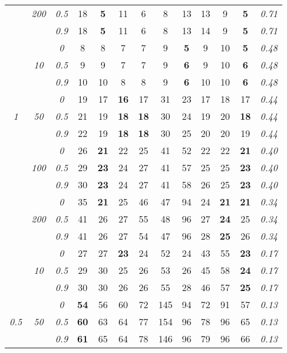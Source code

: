 \begin{table}
\begin{center}
\begin{tabular}{ccc|cc|cc|cc|cc|c|c}
 & \it  200  & \it  0.5  & 18 & {\bf 5} & 11 & 6 & 8 & 13 & 13 & 9 & {\bf 5} & \it  0.71 \\
& & \it  0.9  & 18 & {\bf 5} & 11 & 6 & 8 & 13 & 14 & 9 & {\bf 5} & \it  0.71 \\
\hline\rule{0pt}{3ex}
& & \it  0  & 8 & 8 & 7 & 7 & 9 & {\bf 5} & 9 & 10 & {\bf 5} & \it  0.48 \\
 & \it  10  & \it  0.5  & 9 & 9 & 7 & 7 & 9 & {\bf 6} & 9 & 10 & {\bf 6} & \it  0.48 \\
& & \it  0.9  & 10 & 10 & 8 & 8 & 9 & {\bf 6} & 10 & 10 & {\bf 6} & \it  0.48 \\[1ex]
\cline{2-3}\rule{0pt}{3ex}
& & \it  0  & 19 & 17 & {\bf 16} & 17 & 31 & 23 & 17 & 18 & 17 & \it  0.44 \\
\it  1  & \it  50  & \it  0.5  & 21 & 19 & {\bf 18} & {\bf 18} & 30 & 24 & 19 & 20 & {\bf 18} & \it  0.44 \\
& & \it  0.9  & 22 & 19 & {\bf 18} & {\bf 18} & 30 & 25 & 20 & 20 & 19 & \it  0.44 \\[1ex]
\cline{2-3}\rule{0pt}{3ex}
& & \it  0  & 26 & {\bf 21} & 22 & 25 & 41 & 52 & 22 & 22 & {\bf 21} & \it  0.40 \\
 & \it  100  & \it  0.5  & 29 & {\bf 23} & 24 & 27 & 41 & 57 & 25 & 25 & {\bf 23} & \it  0.40 \\
& & \it  0.9  & 30 & {\bf 23} & 24 & 27 & 41 & 58 & 26 & 25 & {\bf 23} & \it  0.40 \\[1ex]
\cline{2-3}\rule{0pt}{3ex}
& & \it  0  & 35 & {\bf 21} & 25 & 46 & 47 & 94 & 24 & {\bf 21} & {\bf 21} & \it  0.34 \\
 & \it  200  & \it  0.5  & 41 & 26 & 27 & 55 & 48 & 96 & 27 & {\bf 24} & 25 & \it  0.34 \\
& & \it  0.9  & 41 & 26 & 27 & 54 & 47 & 96 & 28 & {\bf 25} & 26 & \it  0.34 \\
\hline\rule{0pt}{3ex}
& & \it  0  & 27 & 27 & {\bf 23} & 24 & 52 & 24 & 43 & 55 & {\bf 23} & \it  0.17 \\
 & \it  10  & \it  0.5  & 29 & 30 & 25 & 26 & 53 & 26 & 45 & 58 & {\bf 24} & \it  0.17 \\
& & \it  0.9  & 30 & 30 & 26 & 26 & 55 & 28 & 46 & 57 & {\bf 25} & \it  0.17 \\[1ex]
\cline{2-3}\rule{0pt}{3ex}
& & \it  0  & {\bf 54} & 56 & 60 & 72 & 145 & 94 & 72 & 91 & 57 & \it  0.13 \\
\it  0.5  & \it  50  & \it  0.5  & {\bf 60} & 63 & 64 & 77 & 154 & 96 & 78 & 96 & 65 & \it  0.13 \\
& & \it  0.9  & {\bf 61} & 65 & 64 & 78 & 146 & 96 & 79 & 96 & 66 & \it  0.13 \\[1ex]

\end{tabular}
\end{center}
\end{table}
